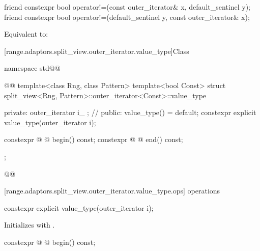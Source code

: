{{%
\begin{itemdecl}
friend constexpr bool operator!=(const outer_iterator& x, default_sentinel y);
friend constexpr bool operator!=(default_sentinel y, const outer_iterator& x);
\end{itemdecl}

\begin{itemdescr}
\pnum
\effects Equivalent to: 
\end{itemdescr}
} %

[range.adaptors.split_view.outer_iterator.value_type]{Class }

\pnum
\begin{note}
\end{note}

\begin{codeblock}
namespace std@@ { @@
  template<class Rng, class Pattern>
  template<bool Const>
  struct split_view<Rng, Pattern>::outer_iterator<Const>::value_type {
  private:
    outer_iterator i_ {}; // \expos
  public:
    value_type() = default;
    constexpr explicit value_type(outer_iterator i);

    constexpr @ @ begin() const;
    constexpr @ @ end() const;
  };
}@\oldtxt{\}}@
\end{codeblock}

[range.adaptors.split_view.outer_iterator.value_type.ops]{ operations}

%
\begin{itemdecl}
constexpr explicit value_type(outer_iterator i);
\end{itemdecl}

\begin{itemdescr}
\pnum
\effects Initializes  with .
\end{itemdescr}

%
\begin{itemdecl}
constexpr @ @ begin() const;
\end{itemdecl}

}

